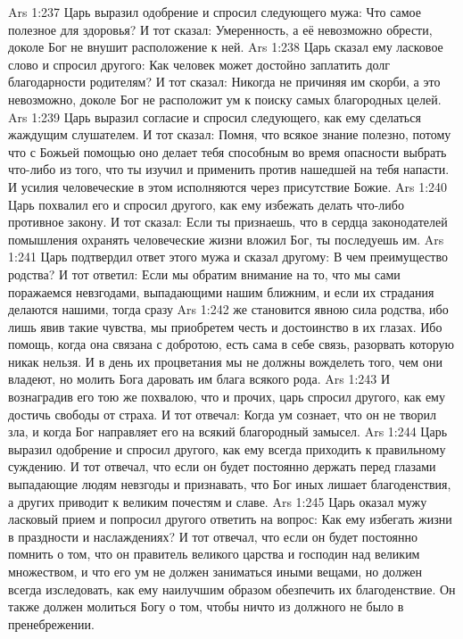 \vs Ars 1:237
Царь выразил одобрение и спросил следующего мужа: Что самое полезное для здоровья? И тот сказал: Умеренность, а её невозможно обрести, доколе Бог не внушит расположение к ней.
\vs Ars 1:238
Царь сказал ему ласковое слово и спросил другого: Как человек может достойно заплатить долг благодарности родителям? И тот сказал: Никогда не причиняя им скорби, а это невозможно, доколе Бог не расположит ум к поиску самых благородных целей.
\vs Ars 1:239
Царь выразил согласие и спросил следующего, как ему сделаться жаждущим слушателем. И тот сказал: Помня, что всякое знание полезно, потому что с Божьей помощью оно делает тебя способным во время опасности выбрать что-либо из того, что ты изучил и применить против нашедшей на тебя напасти. И усилия человеческие в этом исполняются через присутствие Божие.
\vs Ars 1:240
Царь похвалил его и спросил другого, как ему избежать делать что-либо противное закону. И тот сказал: Если ты признаешь, что в сердца законодателей помышления охранять человеческие жизни вложил Бог, ты последуешь им.
\vs Ars 1:241
Царь подтвердил ответ этого мужа и сказал другому: В чем преимущество родства? И тот ответил: Если мы обратим внимание на то, что мы сами поражаемся невзгодами, выпадающими нашим ближним, и если их страдания делаются нашими, тогда сразу
\vs Ars 1:242
же становится явною сила родства, ибо лишь явив такие чувства, мы приобретем честь и достоинство в их глазах. Ибо помощь, когда она связана с добротою, есть сама в себе связь, разорвать которую никак нельзя. И в день их процветания мы не должны вожделеть того, чем они владеют, но молить Бога даровать им блага всякого рода.
\vs Ars 1:243
И вознаградив его тою же похвалою, что и прочих, царь спросил другого, как ему достичь свободы от страха. И тот отвечал: Когда ум сознает, что он не творил зла, и когда Бог направляет его на всякий благородный замысел.
\vs Ars 1:244
Царь выразил одобрение и спросил другого, как ему всегда приходить к правильному суждению. И тот отвечал, что если он будет постоянно держать перед глазами выпадающие людям невзгоды и признавать, что Бог иных лишает благоденствия, а других приводит к великим почестям и славе.
\vs Ars 1:245
Царь оказал мужу ласковый прием и попросил другого ответить на вопрос: Как ему избегать жизни в праздности и наслаждениях? И тот отвечал, что если он будет постоянно помнить о том, что он правитель великого царства и господин над великим множеством, и что его ум не должен заниматься иными вещами, но должен всегда изследовать, как ему наилучшим образом обезпечить их благоденствие. Он также должен молиться Богу о том, чтобы ничто из должного не было в пренебрежении.
